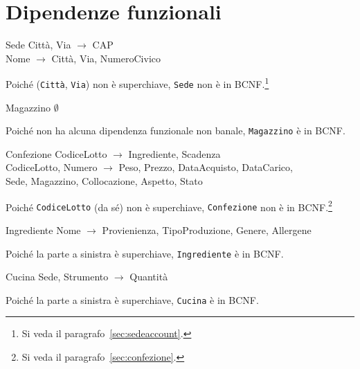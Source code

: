 \section{Dipendenze funzionali}\label{sec:functionaldependencies}
\begin{samepage}
\begin{funcdep}{Sede}
    Città, Via $\to$ CAP\\
    Nome $\to$ Città, Via, NumeroCivico
\end{funcdep}
Poiché ({\tt Città}, {\tt Via}) non è superchiave, {\tt Sede} non
è in BCNF.\footnote{\label{note:nonbcnf}Si veda il paragrafo~\vref{sec:sedeaccount}.}
\end{samepage}

\begin{samepage}
\begin{funcdep}{Magazzino}
    $\emptyset$
\end{funcdep}
Poiché non ha alcuna dipendenza funzionale non banale, {\tt Magazzino} è in BCNF.
\end{samepage}

\begin{samepage}
\begin{funcdep}{Confezione}
    CodiceLotto $\to$ Ingrediente, Scadenza\\
    CodiceLotto, Numero $\to$ Peso, Prezzo, DataAcquisto, DataCarico,\\
        \indent\indent\indent\indent\indent  Sede, Magazzino, Collocazione, Aspetto, Stato
\end{funcdep}
Poiché {\tt CodiceLotto} (da sé) non è superchiave, {\tt Confezione} non è in BCNF.\footnote{Si veda il paragrafo~\vref{sec:confezione}.}
\end{samepage}

\begin{samepage}
\begin{funcdep}{Ingrediente}
    Nome $\to$ Provienienza, TipoProduzione, Genere, Allergene
\end{funcdep}
Poiché la parte a sinistra è superchiave, {\tt Ingrediente} è in BCNF.
\end{samepage}

\begin{samepage}
\begin{funcdep}{Cucina}
    Sede, Strumento $\to$ Quantità
\end{funcdep}
Poiché la parte a sinistra è superchiave, {\tt Cucina} è in BCNF.
\end{samepage}

